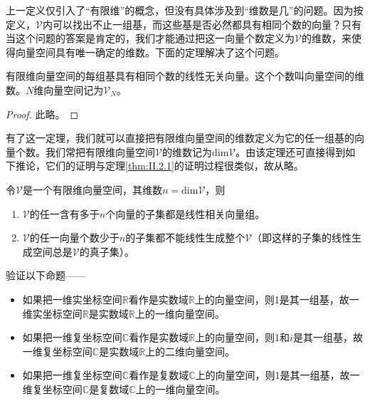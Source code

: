 \documentclass[main.tex]{subfiles}
\begin{document}
上一定义仅引入了“有限维”的概念，但没有具体涉及到“维数是几”的问题。因为按定义，$\mathcal{V}$内可以找出不止一组基，而这些基是否必然都具有相同个数的向量？只有当这个问题的答案是肯定的，我们才能通过把这一向量个数定义为$\mathcal{V}$的维数，来使得向量空间具有唯一确定的维数。下面的定理解决了这个问题。

\begin{theorem}\label{thm:II.2.1}
有限维向量空间的每组基具有相同个数的线性无关向量。这个个数叫向量空间的维数。$N$维向量空间记为$\mathcal{V}_N$。
\end{theorem}
\begin{proof}
此略\cite[“(3)的证明”，p.~171]{周胜林2012线性代数}\cite[\S 2.3,Theorem 4,p.~44]{Hoffman1971}。
\end{proof}

有了这一定理，我们就可以直接把有限维向量空间的维数定义为它的任一组基的向量个数。我们常把有限维向量空间$\mathcal{V}$的维数记为$\mathrm{dim}\mathcal{V}$。由该定理还可直接得到如下推论，它们的证明与定理\ref{thm:II.2.1}的证明过程很类似，故从略。

\begin{corollary}
令$\mathcal{V}$是一个有限维向量空间，其维数$n=\mathrm{dim}\mathcal{V}$，则
\begin{enumerate}
    \item $\mathcal{V}$的任一含有多于$n$个向量的子集都是线性相关向量组\cite[“(3)的证明”，p.~171]{周胜林2012线性代数}。
    \item $\mathcal{V}$的任一向量个数少于$n$的子集都不能线性生成整个$\mathcal{V}$（即这样的子集的线性生成空间总是$\mathcal{V}$的真子集）。
\end{enumerate}
\end{corollary}

\begin{example}
验证以下命题——
\begin{itemize}
    \item 如果把一维实坐标空间$\mathbb{R}$看作是实数域$\mathbb{R}$上的向量空间，则1是其一组基，故一维实坐标空间$\mathbb{R}$是实数域$\mathbb{R}$上的一维向量空间。
    \item 如果把一维复坐标空间$\mathbb{C}$看作是实数域$\mathbb{R}$上的向量空间，则1和$i$是其一组基，故一维复坐标空间$\mathbb{C}$是实数域$\mathbb{R}$上的二维向量空间。
    \item 如果把一维复坐标空间$\mathbb{C}$看作是复数域$\mathbb{C}$上的向量空间，则1是其一组基，故一维复坐标空间$\mathbb{C}$是复数域$\mathbb{C}$上的一维向量空间。
\end{itemize}
\end{example}
\end{document}

